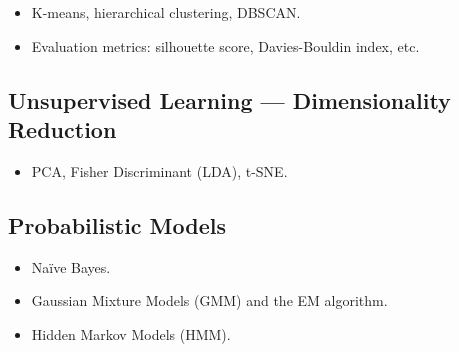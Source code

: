 \documentclass[11pt,a4paper]{article}
\theoremstyle{definition}
\theoremstyle{plain}
\theoremstyle{remark}
\begin{document}
\begin{itemize}
    \item K-means, hierarchical clustering, DBSCAN.
    \item Evaluation metrics: silhouette score, Davies-Bouldin index, etc.
\end{itemize}

\subsection{Unsupervised Learning --- Dimensionality Reduction}

\begin{itemize}
    \item PCA, Fisher Discriminant (LDA), t-SNE.
\end{itemize}

\subsection{Probabilistic Models}

\begin{itemize}
    \item Na\"ive Bayes.
    \item Gaussian Mixture Models (GMM) and the EM algorithm.
    \item Hidden Markov Models (HMM).
\end{itemize}
\end{document}
